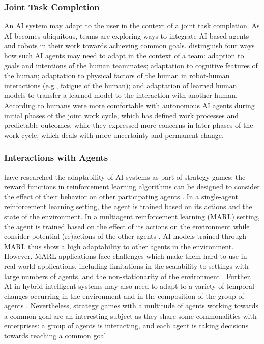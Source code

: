 \subsubsection{Joint Task Completion}

An AI system may adapt to the user in the context of a joint task completion. As AI becomes ubiquitous, teams are exploring ways to
integrate AI-based agents and robots in their work towards achieving common goals. \cite{zhaoRoleAdaptationCollective2022} distinguish
four ways how such AI agents may need to adapt in the context of a team: adaption to goals and intentions of the human teammates;
adaptation to cognitive features of the human; adaptation to physical factors of the human in robot-human interactions (e.g., fatigue
of the human); and adaptation of learned human models to transfer a learned model to the interaction with another human.
According to \cite{hauptmanAdaptOvercomePerceptions2023} humans were more comfortable with autonomous AI agents during
initial phases of the joint work cycle, which has defined work processes and predictable outcomes, while they expressed more
concerns in later phases of the work cycle, which deals with more uncertainty and permanent change.
 
\subsubsection{Interactions with Agents}

\cite{madeiraDesigningReinforcementLearningBased2006} have researched the adaptability of AI 
systems as part of strategy games: the reward functions in reinforcement learning algorithms can be designed to consider
the effect of their behavior on other participating agents \citep{madeiraDesigningReinforcementLearningBased2006}.
In a single-agent reinforcement learning setting, the agent is trained based on its actions and the state of the
environment. In a multiagent reinforcement learning (MARL) setting, the agent is trained based on the effect of its
actions on the environment while consider potential (re)actions of the other agents \citep{caneseMultiAgentReinforcementLearning2021}.
AI models trained through MARL thus show a high adaptability to other agents in the environment. However, MARL applications
face challenges which make them hard to use in real-world applications, including limitations in the scalability to settings
with large numbers of agents, and the non-stationarity of the environment \citep{caneseMultiAgentReinforcementLearning2021}. 
Further, AI in hybrid intelligent systems may also need to adapt to a variety of temporal changes occurring in the environment
and in the composition of the group of agents \citep{akataResearchAgendaHybrid2020a}. Nevertheless, strategy games with a
multitude of agents working towards a common goal are an interesting subject as they share some commonalities with enterprises:
a group of agents is interacting, and each agent is taking decisions towards reaching a common goal.

